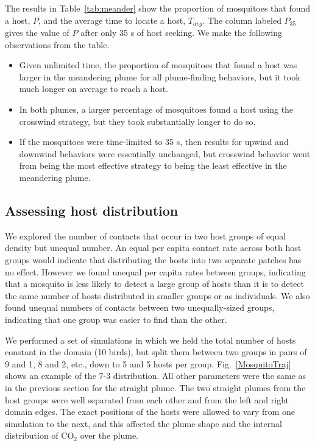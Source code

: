 \documentclass[10pt]{article}
\begin{document}
				The results in Table~\ref{tab:meander} show the proportion of mosquitoes that found a host, $P$, and the average time to locate a host, $T_{avg}$. The column labeled $P_{35}$ gives the value of $P$ after only 35 s of host seeking. We make the following observations from the table.
		\begin{itemize}
			\item Given unlimited time, the proportion of mosquitoes that found a host was larger in the meandering plume for all plume-finding behaviors, but it took much longer on average to reach a host.
			\item In both plumes, a larger percentage of mosquitoes found a host using the crosswind strategy, but they took substantially longer to do so. 
			\item If the mosquitoes were time-limited to 35 s, then results for upwind and downwind behaviors were essentially unchanged, but crosswind behavior went from being the most effective strategy to being the least effective in the meandering plume.
		\end{itemize}
			
	
\subsection*{Assessing host distribution}\label{sec:hostdist}
We explored the number of contacts that occur in two host groups of equal density but unequal number. An equal per capita contact rate across both host groups would indicate that distributing the hosts into two separate patches has no effect. However we found unequal per capita rates between groups, indicating that a mosquito is less likely to detect a large group of hosts than it is to detect the same number of hosts distributed in smaller groups or as individuals. We also found unequal numbers of contacts between two unequally-sized groups, indicating that one group was easier to find than the other.

We performed a set of simulations in which we held the total number of hosts constant in the domain (10 birds), but split them between two groups in pairs of 9 and 1, 8 and 2, etc., down to 5 and 5 hosts per group.  Fig.~\ref{MosquitoTraj} shows an example of the 7-3 distribution.
All other parameters were the same as in the previous section for the straight plume.
The two straight plumes from the host groups were well separated from each other and from the left and right domain edges. The exact positions of the hosts were allowed to vary from one simulation to the next, and this affected the plume shape and the internal distribution of $\mbox{CO}_2$ over the plume.
\end{document}

